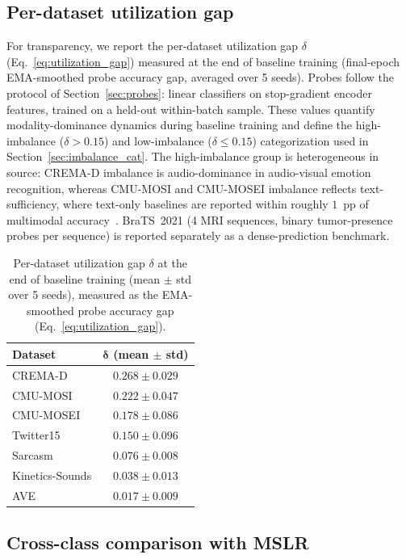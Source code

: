 \documentclass{article} %
\begin{document}
\subsection{Per-dataset utilization gap}
\label{app:delta}

For transparency, we report the per-dataset utilization gap $\delta$ (Eq.~\eqref{eq:utilization_gap}) measured at the end of baseline training (final-epoch EMA-smoothed probe accuracy gap, averaged over 5 seeds). Probes follow the protocol of Section~\ref{sec:probes}: linear classifiers on stop-gradient encoder features, trained on a held-out within-batch sample. These values quantify modality-dominance dynamics during baseline training and define the high-imbalance ($\delta > 0.15$) and low-imbalance ($\delta \leq 0.15$) categorization used in Section~\ref{sec:imbalance_cat}. The high-imbalance group is heterogeneous in source: CREMA-D imbalance is audio-dominance in audio-visual emotion recognition, whereas CMU-MOSI and CMU-MOSEI imbalance reflects text-sufficiency, where text-only baselines are reported within roughly $1$~pp of multimodal accuracy~\citep{li2023agm,wei2025dgl}. BraTS~2021 (4 MRI sequences, binary tumor-presence probes per sequence) is reported separately as a dense-prediction benchmark.

\begin{table}[H]
\centering
\caption{Per-dataset utilization gap $\delta$ at the end of baseline training (mean $\pm$ std over 5 seeds), measured as the EMA-smoothed probe accuracy gap (Eq.~\eqref{eq:utilization_gap}).}
\label{tab:delta_per_dataset}
\vspace{0.3em}
\begin{tabular}{lc}
\toprule
\textbf{Dataset} & $\boldsymbol{\delta}$ \textbf{(mean $\pm$ std)} \\
\midrule
CREMA-D       & $0.268 \pm 0.029$ \\
CMU-MOSI      & $0.222 \pm 0.047$ \\
CMU-MOSEI     & $0.178 \pm 0.086$ \\
Twitter15     & $0.150 \pm 0.096$ \\
Sarcasm       & $0.076 \pm 0.008$ \\
Kinetics-Sounds & $0.038 \pm 0.013$ \\
AVE           & $0.017 \pm 0.009$ \\
\bottomrule
\end{tabular}
\end{table}

\subsection{Cross-class comparison with MSLR}
\label{app:mslr}
\end{document}
